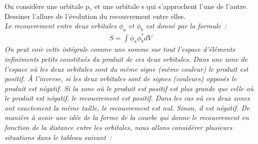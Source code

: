 On consid\`ere une orbitale p$_z$ et une orbitale s qui s'approchent l'une de l'autre.
Dessiner l'allure de l'\'evolution du recouvrement entre elles.\\
\textsl{%
Le recouvrement entre deux orbitales $\phi_a$ et $\phi_b$ est donné par la formule~:
\begin{align*}
S = \int \phi_a \phi_b^* dV
\end{align*}
On peut voir cette intégrale comme une somme sur tout l'espace d'éléments infiniments
petits constitués du produit de ces deux orbitales.
Dans une zone de l'espace où les deux orbitales sont du même signe (même couleur)
le produit est positif.
À l'inverse, si les deux orbitales sont de signes (couleurs) opposés le produit est négatif.
Si la zone où le produit est positif est plus grande que celle où le produit est négatif,
le recouvrement est positif.
Dans les cas où ces deux zones ont exactement la même taille, le recouvrement est nul.
Sinon, il est négatif.
%
De manière à avoir une idée de la forme de la courbe qui donne le recouvrement en fonction
de la distance entre les orbitales, nous allons considérer plusieurs situations dans le tableau suivant~:\\
}
